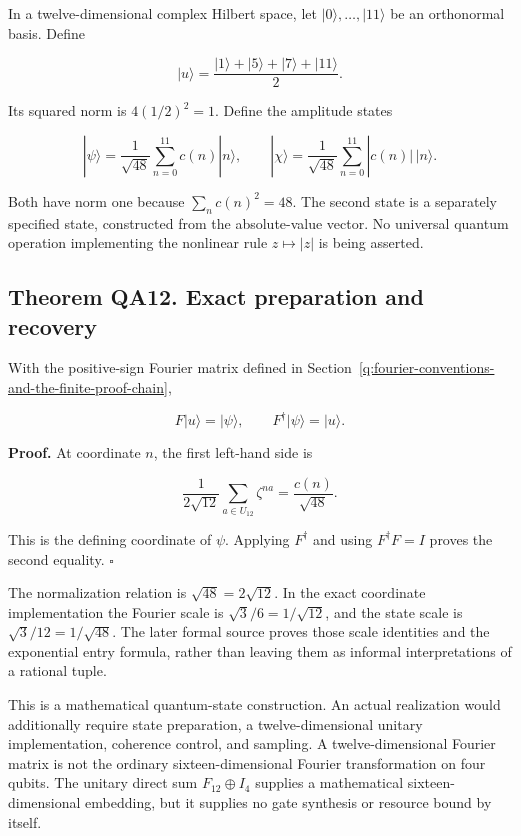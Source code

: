 In a twelve-dimensional complex Hilbert space, let
\(|0\rangle,\ldots,|11\rangle\) be an orthonormal basis. Define

\[
|u\rangle=\frac{|1\rangle+|5\rangle+|7\rangle+|11\rangle}{2}.
\]

Its squared norm is \(4(1/2)^2=1\). Define the amplitude states

\[
|\psi\rangle=\frac1{\sqrt{48}}\sum_{n=0}^{11}c(n)|n\rangle,
\qquad
|\chi\rangle=\frac1{\sqrt{48}}\sum_{n=0}^{11}|c(n)|\,|n\rangle.
\]

Both have norm one because \(\sum_nc(n)^2=48\). The second state is a
separately specified state, constructed from the absolute-value vector.
No universal quantum operation implementing the nonlinear rule
\(z\mapsto|z|\) is being asserted.

\hypertarget{q:theorem-qa12.-exact-preparation-and-recovery}{%
\subsection*{Theorem QA12. Exact preparation and
recovery}\label{q:theorem-qa12.-exact-preparation-and-recovery}}

With the positive-sign Fourier matrix defined in Section~\ref{q:fourier-conventions-and-the-finite-proof-chain},

\[
\boxed{F|u\rangle=|\psi\rangle,
\qquad F^\dagger|\psi\rangle=|u\rangle.}
\]

\textbf{Proof.} At coordinate \(n\), the first left-hand side is

\[
\frac1{2\sqrt{12}}\sum_{a\in U_{12}}\zeta^{na}
=\frac{c(n)}{\sqrt{48}}.
\]

This is the defining coordinate of \(\psi\). Applying \(F^\dagger\) and
using \(F^\dagger F=I\) proves the second equality. \(\square\)

The normalization relation is \(\sqrt{48}=2\sqrt{12}\). In the exact
coordinate implementation the Fourier scale is \(\sqrt3/6=1/\sqrt{12}\),
and the state scale is \(\sqrt3/12=1/\sqrt{48}\). The later formal
source proves those scale identities and the exponential entry formula,
rather than leaving them as informal interpretations of a rational
tuple.

This is a mathematical quantum-state construction. An actual realization
would additionally require state preparation, a twelve-dimensional
unitary implementation, coherence control, and sampling. A
twelve-dimensional Fourier matrix is not the ordinary
sixteen-dimensional Fourier transformation on four qubits. The unitary
direct sum \(F_{12}\oplus I_4\) supplies a mathematical
sixteen-dimensional embedding, but it supplies no gate synthesis or
resource bound by itself.

